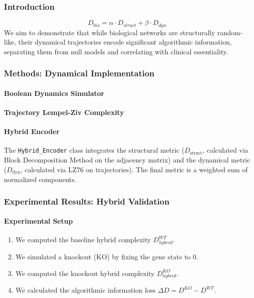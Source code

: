 





\subsubsection{Introduction}
\[ D_{bio} = \alpha \cdot D_{struct} + \beta \cdot D_{dyn} \]
We aim to demonstrate that while biological networks are structurally random-like, their dynamical trajectories encode significant algorithmic information, separating them from null models and correlating with clinical essentiality.

\subsubsection{Methods: Dynamical Implementation}

\paragraph{Boolean Dynamics Simulator}

\paragraph{Trajectory Lempel-Ziv Complexity}

\paragraph{Hybrid Encoder}
The \texttt{Hybrid\_Encoder} class integrates the structural metric ($D_{\text{struct}}$, calculated via Block Decomposition Method on the adjacency matrix) and the dynamical metric ($D_{\text{dyn}}$, calculated via LZ76 on trajectories). The final metric is a weighted sum of normalized components.

\subsubsection{Experimental Results: Hybrid Validation}

\paragraph{Experimental Setup}
\begin{enumerate}
    \item We computed the baseline hybrid complexity $D_{hybrid}^{WT}$.
    \item We simulated a knockout (KO) by fixing the gene state to 0.
    \item We computed the knockout hybrid complexity $D_{hybrid}^{KO}$.
    \item We calculated the algorithmic information loss $\Delta D = D^{KO} - D^{WT}$.
\end{enumerate}

